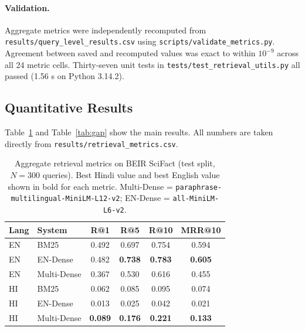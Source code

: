 \documentclass[acmsmall,screen,review]{acmart}
\begin{document}
\paragraph{Validation.}
Aggregate metrics were independently recomputed from
\texttt{results/query\_level\_results.csv} using
\texttt{scripts/validate\_metrics.py}.  Agreement between saved and
recomputed values was exact to within $10^{-9}$ across all 24 metric
cells.  Thirty-seven unit tests in \texttt{tests/test\_retrieval\_utils.py}
all passed (1.56 s on Python 3.14.2).

\subsection{Quantitative Results}
\label{sec:results-quant}

Table~\ref{tab:metrics} and Table~\ref{tab:gap} show the main results.
All numbers are taken directly from
\texttt{results/retrieval\_metrics.csv}.

\begin{table}[t]
\centering
\small
\caption{Aggregate retrieval metrics on BEIR SciFact (test split,
$N = 300$ queries).  Best Hindi value and best English value shown in
bold for each metric.  Multi-Dense = \texttt{paraphrase-multilingual-MiniLM-L12-v2};
EN-Dense = \texttt{all-MiniLM-L6-v2}.}
\label{tab:metrics}
\begin{tabular}{llcccc}
\toprule
Lang & System & R@1 & R@5 & R@10 & MRR@10 \\
\midrule
EN & BM25         & 0.492 & 0.697 & 0.754 & 0.594 \\
EN & EN-Dense     & 0.482 & \textbf{0.738} & \textbf{0.783} & \textbf{0.605} \\
EN & Multi-Dense  & 0.367 & 0.530 & 0.616 & 0.455 \\
\midrule
HI & BM25         & 0.062 & 0.085 & 0.095 & 0.074 \\
HI & EN-Dense     & 0.013 & 0.025 & 0.042 & 0.021 \\
HI & Multi-Dense  & \textbf{0.089} & \textbf{0.176} & \textbf{0.221} & \textbf{0.133} \\
\bottomrule
\end{tabular}
\end{table}
\end{document}
